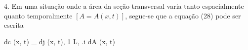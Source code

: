 4. Em uma situação onde a área da seção transversal varia tanto espacialmente quanto temporalmente $[A = A(x, t)]$, segue-se que a equação (28) pode ser escrita

dc (x, t) _ dj (x, t), 1 L, .i dA (x, t)

